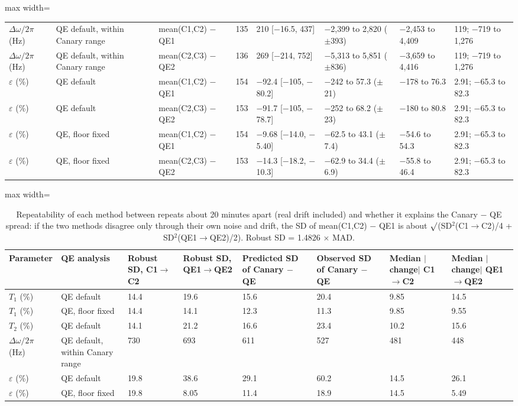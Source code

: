 \begin{table}[!t]
\begin{adjustbox}{max width=\linewidth}
\begin{tabular}{llllllll}
$\Delta\omega/2\pi$ (Hz) & QE default, within Canary range & mean(C1,C2) $-$ QE1 & 135 & 210 [$-$16.5, 437] & $-$2,399 to 2,820 ($\pm$393) & $-$2,453 to 4,409 & 119; $-$719 to 1,276 \\
$\Delta\omega/2\pi$ (Hz) & QE default, within Canary range & mean(C2,C3) $-$ QE2 & 136 & 269 [$-$214, 752] & $-$5,313 to 5,851 ($\pm$836) & $-$3,659 to 4,416 & 119; $-$719 to 1,276 \\
$\varepsilon$ (\%) & QE default & mean(C1,C2) $-$ QE1 & 154 & $-$92.4 [$-$105, $-$80.2] & $-$242 to 57.3 ($\pm$21) & $-$178 to 76.3 & 2.91; $-$65.3 to 82.3 \\
$\varepsilon$ (\%) & QE default & mean(C2,C3) $-$ QE2 & 153 & $-$91.7 [$-$105, $-$78.7] & $-$252 to 68.2 ($\pm$23) & $-$180 to 80.8 & 2.91; $-$65.3 to 82.3 \\
$\varepsilon$ (\%) & QE, floor fixed & mean(C1,C2) $-$ QE1 & 154 & $-$9.68 [$-$14.0, $-$5.40] & $-$62.5 to 43.1 ($\pm$7.4) & $-$54.6 to 54.3 & 2.91; $-$65.3 to 82.3 \\
$\varepsilon$ (\%) & QE, floor fixed & mean(C2,C3) $-$ QE2 & 153 & $-$14.3 [$-$18.2, $-$10.3] & $-$62.9 to 34.4 ($\pm$6.9) & $-$55.8 to 46.4 & 2.91; $-$65.3 to 82.3 \\
\hline
\end{tabular}
\end{adjustbox}
\end{table}

\begin{table}[!t]
\centering
\footnotesize
\caption{Repeatability of each method between repeats about 20 minutes apart (real drift included) and whether it explains the Canary $-$ QE spread: if the two methods disagree only through their own noise and drift, the SD of mean(C1,C2) $-$ QE1 is about $\surd$(SD$^2$(C1$\to$C2)/4 + SD$^2$(QE1$\to$QE2)/2). Robust SD = 1.4826 $\times$ MAD.}
\label{tab:h2}
\begin{adjustbox}{max width=\linewidth}
\begin{tabular}{llllllll}
\hline
Parameter & QE analysis & Robust SD, C1$\to$C2 & Robust SD, QE1$\to$QE2 & Predicted SD of Canary $-$ QE & Observed SD of Canary $-$ QE & Median $|$change$|$ C1$\to$C2 & Median $|$change$|$ QE1$\to$QE2 \\
\hline
$T_1$ (\%) & QE default & 14.4 & 19.6 & 15.6 & 20.4 & 9.85 & 14.5 \\
$T_1$ (\%) & QE, floor fixed & 14.4 & 14.1 & 12.3 & 11.3 & 9.85 & 9.55 \\
$T_2$ (\%) & QE default & 14.1 & 21.2 & 16.6 & 23.4 & 10.2 & 15.6 \\
$\Delta\omega/2\pi$ (Hz) & QE default, within Canary range & 730 & 693 & 611 & 527 & 481 & 448 \\
$\varepsilon$ (\%) & QE default & 19.8 & 38.6 & 29.1 & 60.2 & 14.5 & 26.1 \\
$\varepsilon$ (\%) & QE, floor fixed & 19.8 & 8.05 & 11.4 & 18.9 & 14.5 & 5.49 \\
\hline
\end{tabular}
\end{adjustbox}
\end{table}

